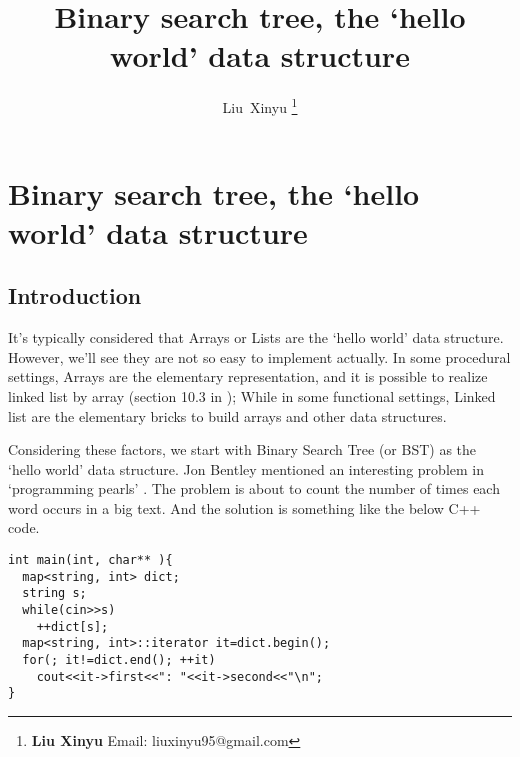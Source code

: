 \documentclass{article}
\begin{document}
\fi


\title{Binary search tree, the `hello world' data structure}

\author{Liu~Xinyu
\thanks{{\bfseries Liu Xinyu } \newline
  Email: liuxinyu95@gmail.com \newline}
  }


\maketitle

\ifx\wholebook\relax
\chapter{Binary search tree, the `hello world' data structure}
\fi

\section{Introduction}
\label{introduction}

It's typically considered that Arrays or Lists are the `hello world' data structure.
However, we'll see they are not so easy to implement actually. In some procedural 
settings, Arrays are the elementary representation, and it is possible to realize
linked list by array (section 10.3 in \cite{CLRS}); While in some functional settings,
Linked list are the elementary bricks to build arrays and other data structures.

Considering these factors, we start with Binary Search Tree (or BST) as the `hello world'
data structure. Jon Bentley mentioned an interesting problem in `programming pearls'
\cite{Bentley}. The problem is about to count the number of times each word occurs
in a big text. And the solution is something like the below C++ code.

\lstset{language=C++}
\begin{lstlisting}
int main(int, char** ){
  map<string, int> dict;
  string s;
  while(cin>>s)
    ++dict[s];
  map<string, int>::iterator it=dict.begin();
  for(; it!=dict.end(); ++it)
    cout<<it->first<<": "<<it->second<<"\n";
}
\end{lstlisting}
\end{document}
